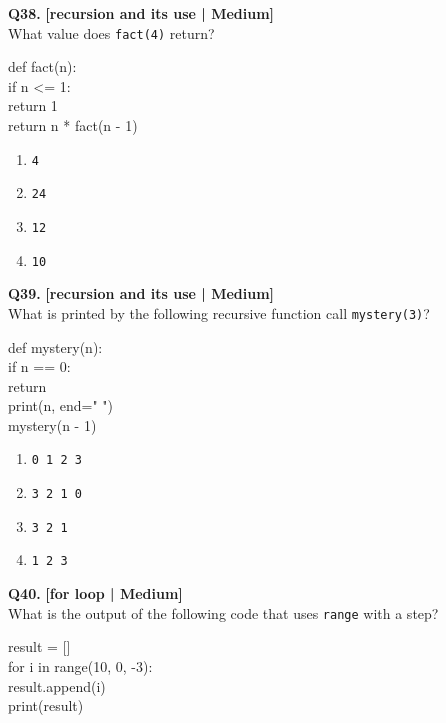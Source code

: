 \noindent\textbf{Q38.} \hfill {\small\color{LPUOrange}\textbf{[recursion and its use | Medium]}}\\[2pt]
What value does \texttt{fact(4)} return? 

\begin{pycode}
def fact(n):\\
if n <= 1:\\
return 1\\
return n * fact(n - 1)
\end{pycode}

\begin{enumerate}[label=(\alph*),topsep=2pt,itemsep=1pt,partopsep=0pt,parsep=0pt]
    \item \relax \texttt{4}
    \item \relax \texttt{24}
    \item \relax \texttt{12}
    \item \relax \texttt{10}
\end{enumerate}
\vspace{2mm}

\noindent\textbf{Q39.} \hfill {\small\color{LPUOrange}\textbf{[recursion and its use | Medium]}}\\[2pt]
What is printed by the following recursive function call \texttt{mystery(3)}? 

\begin{pycode}
def mystery(n):\\
if n == 0:\\
return\\
print(n, end=" ")\\
mystery(n - 1)
\end{pycode}

\begin{enumerate}[label=(\alph*),topsep=2pt,itemsep=1pt,partopsep=0pt,parsep=0pt]
    \item \relax \texttt{0 1 2 3}
    \item \relax \texttt{3 2 1 0}
    \item \relax \texttt{3 2 1}
    \item \relax \texttt{1 2 3}
\end{enumerate}
\vspace{2mm}

\noindent\textbf{Q40.} \hfill {\small\color{LPUOrange}\textbf{[for loop | Medium]}}\\[2pt]
What is the output of the following code that uses \texttt{range} with a step? 

\begin{pycode}
result = []\\
for i in range(10, 0, -3):\\
result.append(i)\\
print(result)
\end{pycode}

